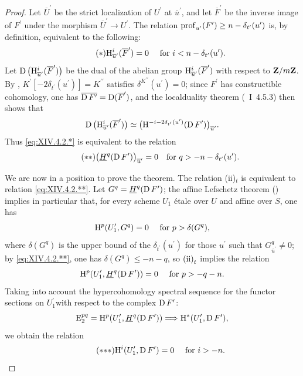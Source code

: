 \begin{proof}
Let $\overline{U}^{\prime}$ be the strict localization of $U^{\prime}$ at $\overline{u}^{\prime}$, and let $\overline{F}^{\prime}$ be the inverse image of $F^{\prime}$ under the morphism $\overline{U}^{\prime}\to U^{\prime}$. The relation $\operatorname{prof}_{u^{\prime}}(F^{\prime})\geq n-\delta_{t^{\prime}}(u^{\prime})$ is, by definition, equivalent to the following:
\begin{equation*} \label{eq:XIV.4.2.*} \tag{$*$} {\mathrm H_{\overline{u}^{\prime}}^{i}(\overline{F}^{\prime})=0\quad\textrm{ for }i<n-\delta_{t^{\prime}}(u^{\prime}).}
\end{equation*}
Let $\operatorname{D}\big(\mathrm H_{\overline{u}^{\prime}}^{i}(\overline{F}^{\prime})\big)$ be the dual of the abelian group $\mathrm H_{\overline{u}^{\prime}}^{i}(\overline{F}^{\prime})$ with respect to $\mathbf Z/m\mathbf Z$. By , $K^{\prime}[-2\delta_{t^{\prime}}(u^{\prime})]=K^{\prime\prime}$ satisfies $\delta^{K^{\prime\prime}}(u^{\prime})=0$; since $F^{\prime}$ has constructible cohomology, one has $\overline{\operatorname{D} F^{\prime}}=\operatorname{D}(\overline{F}^{\prime})$, and the local\pageoriginale duality theorem (~I~4.5.3) then shows that
$$
\operatorname{D}\big(\mathrm H_{\overline{u}^{\prime}}^{i}(\overline{F}^{\prime})\big) \simeq\big(\mathrm H^{-i-2\delta_{t^{\prime}}(u^{\prime})}(\operatorname{D} F^{\prime})\big)_{\overline{u}^{\prime}}.
$$
Thus \eqref{eq:XIV.4.2.*} is equivalent to the relation
\begin{equation*} \label{eq:XIV.4.2.**} \tag{$**$}
\big(\underline{H}^{q}(\operatorname{D} F^{\prime})\big)_{\overline{u}^{\prime}}=0\quad\text{for }q>-n-\delta_{t^{\prime}}(u^{\prime}).
\end{equation*}

We are now in a position to prove the theorem. The relation \textup{(ii)}$_{t}$ is equivalent to relation \eqref{eq:XIV.4.2.**}. Let $G^{q}=\underline{H}^{q}(\operatorname{D} F^{\prime})$; the affine Lefschetz theorem () implies in particular that, for every scheme $U_{1}$ étale over $U$ and affine over $S$, one has
$$
\mathrm H^{p}(U_{1}^{\prime}, G^{q})=0\quad\textrm{ for }p>\delta(G^{q}),
$$
where $\delta(G^{q})$ is the upper bound of the $\delta_{t^{\prime}}(u^{\prime})$ for those $u^{\prime}$ such that $G_{\overline{u}^{\prime}}^{q}\neq 0$; by \eqref{eq:XIV.4.2.**}, one has $\delta(G^{q})\leq -n-q$, so $\textup{(ii)}_{t}$ implies the relation
$$
\mathrm H^{p}(U_{1}^{\prime}, \underline{H}^{q}(\operatorname{D} F^{\prime}))=0\quad\textrm{ for }p>-q-n.
$$
Taking into account the hypercohomology spectral sequence for the functor \og sections on $U_{1}^{\prime}$\fg with respect to the complex $\operatorname{D} F^{\prime}$:
$$
\operatorname{E}_{2}^{pq}=\mathrm H^{p}(U_{1}^{\prime}, \underline{H}^{q}(\operatorname{D} F^{\prime}))\Longrightarrow\mathrm H^{\ast}(U_{1}^{\prime}, \operatorname{D} F^{\prime}),
$$
we obtain the relation
\begin{equation*} \label{eq:XIV.4.2.***} \tag{${*}{*}{*}$}
\H^{i}(U_{1}^{\prime}, \D F^{\prime})=0\quad\textrm{ for }i>-n.
\end{equation*}


\end{proof}
